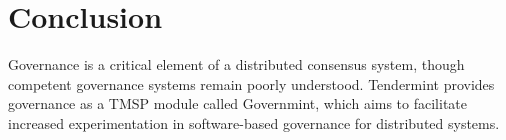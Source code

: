 \section{Conclusion}

Governance is a critical element of a distributed consensus system, 
though competent governance systems remain poorly understood.
Tendermint provides governance as a TMSP module called Governmint,
which aims to facilitate increased experimentation in software-based governance for distributed systems.

